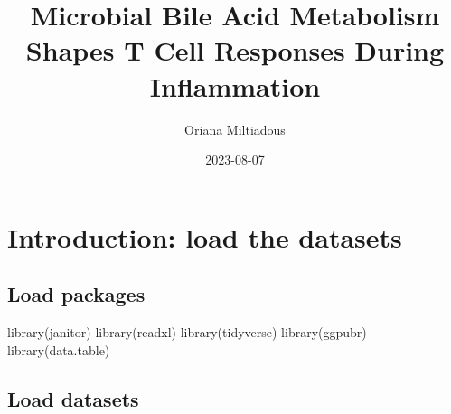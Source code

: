 \documentclass[
]{book}
\title{Microbial Bile Acid Metabolism Shapes T Cell Responses During Inflammation}
\author{Oriana Miltiadous}
\date{2023-08-07}
\newenvironment{Shaded}{\begin{snugshade}}{\end{snugshade}}
\newcommand{\FunctionTok}[1]{\textcolor[rgb]{0.00,0.00,0.00}{#1}}
\newcommand{\NormalTok}[1]{#1}
\begin{document}
\maketitle

{
\setcounter{tocdepth}{1}
\tableofcontents
}
\hypertarget{introduction-load-the-datasets}{%
\chapter{Introduction: load the datasets}\label{introduction-load-the-datasets}}

\hypertarget{load-packages}{%
\section{Load packages}\label{load-packages}}

\begin{Shaded}
\begin{Highlighting}[]
\FunctionTok{library}\NormalTok{(janitor)}
\FunctionTok{library}\NormalTok{(readxl)}
\FunctionTok{library}\NormalTok{(tidyverse)}
\FunctionTok{library}\NormalTok{(ggpubr)}
\FunctionTok{library}\NormalTok{(data.table)}
\end{Highlighting}
\end{Shaded}

\hypertarget{load-datasets}{%
\section{Load datasets}\label{load-datasets}}
\end{document}
